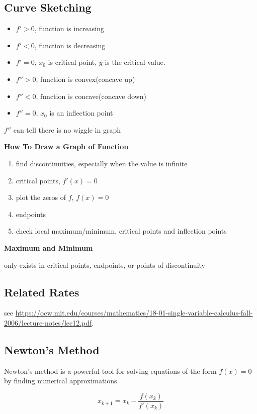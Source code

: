 \documentclass{article}
\begin{document}
\subsection{Curve Sketching}
\begin{itemize}
  \item $f' > 0$, function is increasing
  \item $f' < 0$, function is decreasing
  \item $f' = 0$, $x_0$ is critical point, $y$ is the critical value.
  \item $f'' > 0$, function is convex(concave up)
  \item $f'' < 0$, function is concave(concave down)
  \item $f'' = 0$, $x_0$ is an inflection point
\end{itemize}

$f''$ can tell there is no wiggle in graph

\textbf{How To Draw a Graph of Function}
\begin{enumerate}
  \item find discontinuities, especially when the value is infinite
  \item critical points, $f'(x) = 0$
  \item plot the zeros of $f$, $f(x) = 0$
  \item endpoints
  \item check local maximum/minimum, critical points and inflection points
\end{enumerate}

\textbf{Maximum and Minimum}

only exists in critical points, endpoints, or points of discontinuity

\subsection{Related Rates}

see \url{https://ocw.mit.edu/courses/mathematics/18-01-single-variable-calculus-fall-2006/lecture-notes/lec12.pdf}.
\subsection{Newton's Method}

Newton's method is a powerful tool for solving equations of the form $f(x) = 0$ by finding numerical approximations.

$$x_{k+1} = x_k - \frac{f(x_k)}{f'(x_k)}$$
\end{document}
